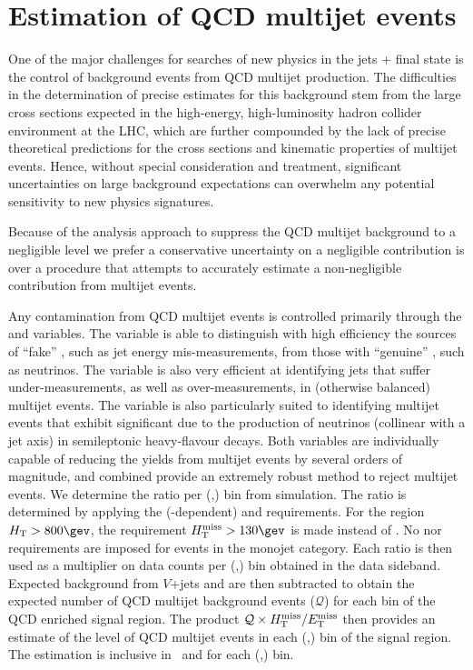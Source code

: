 \section{Estimation of QCD multijet events \label{sec:qcd}}

One of the major challenges for searches of new physics in the jets + \met final state is the control of background events from QCD multijet production. The difficulties in the determination of precise estimates for this background stem from the large cross sections expected in the high-energy, high-luminosity hadron collider environment at the LHC, which are further compounded by the lack of precise theoretical predictions for the cross sections and kinematic properties of multijet events. Hence, without special consideration and treatment, significant uncertainties on large background expectations can overwhelm any potential sensitivity to new physics signatures.


Because of the analysis approach to suppress the QCD multijet background to a negligible level we prefer a conservative uncertainty on a negligible contribution is  over a procedure that attempts to accurately estimate a non-negligible contribution from multijet events.  

Any contamination from QCD multijet events is controlled primarily through the \alphat and \bdphi variables. The \alphat variable is able to distinguish with high efficiency the sources of ``fake'' \met, such as jet energy mis-measurements, from those with ``genuine'' \met, such as neutrinos. The \bdphi variable is also very efficient at identifying jets that suffer under-measurements, as well as over-measurements, in (otherwise balanced) multijet events. The variable is also particularly suited to identifying multijet events that exhibit significant \met due to the production of neutrinos (collinear with a jet axis) in semileptonic heavy-flavour decays. Both variables are individually capable of reducing the yields from multijet events by several orders of magnitude, and combined provide
an extremely robust method to reject multijet events. 
We determine the ratio \rmhtmet per (\njet,\scalht) bin from simulation. The ratio is determined by applying the (\scalht-dependent) \alphat and \bdphi requirements. For the region $\scalht > 800\gev$, the requirement $\mht > 130\gev$ is made instead of \alphat.  No \alphat nor \mht requirements are imposed for events in the monojet category. Each ratio \rmhtmet is then used as a multiplier on data counts per (\njet,\scalht) bin obtained in the \mhtmet data sideband. Expected background from $V$+jets and \ttbar are then subtracted to obtain the expected number of 
QCD multijet background events ($\mathcal{Q}$) for each bin of the QCD enriched signal region. The product $\mathcal{Q} \times \mbox{$\mbox{$H_{\rm T}^{\rm miss}$} / \mbox{$E_\text{T}^{\rm miss}$}$}$ then provides an estimate of the level of QCD multijet events in
each (\njet,\scalht) bin of the signal region. The estimation is inclusive in \nb\ and \mht for each
(\njet,\scalht) bin. 



